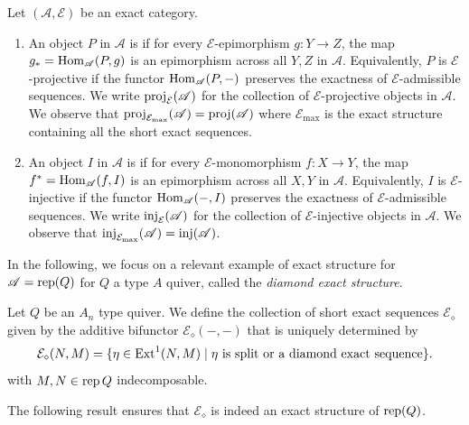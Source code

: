 \begin{definition}
\end{definition}

\begin{definition}\label{def:Eprojectivesinjectives}
Let $(\mathscr{A}, \mathcal{E})$ be an exact category.
\begin{enumerate}[label=$\bullet$,itemsep=1mm]
    \item An object $P$ in $\mathscr{A}$ is  if for every $\mathcal{E}$-epimorphism $g: Y \to Z$, the map $g_* = \operatorname{Hom}_\mathscr{A}(P,g)$ is an epimorphism across all $Y, Z$ in $\mathscr{A}$. Equivalently, $P$ is $\mathcal{E}$-projective if the functor $\operatorname{Hom}_\mathscr{A}(P,-)$ preserves the exactness of $\mathcal{E}$-admissible sequences. We write $\operatorname{proj}_\mathcal{E}(\mathscr{A})$ for the collection of $\mathcal{E}$-projective objects in $\mathscr{A}$. We observe that $\operatorname{proj}_{\mathcal{E}_{\max}}(\mathscr{A}) = \operatorname{proj}(\mathscr{A})$ where $\mathcal{E}_{\max}$ is the exact structure containing all the short exact sequences. 
    \item An object $I$ in $\mathscr{A}$ is  if for every $\mathcal{E}$-monomorphism $f: X \to Y$, the map $f^* = \operatorname{Hom}_\mathscr{A}(f,I)$ is an epimorphism across all $X, Y$ in $\mathscr{A}$. Equivalently, $I$ is $\mathcal{E}$-injective if the functor $\operatorname{Hom}_\mathscr{A}(-,I)$ preserves the exactness of $\mathcal{E}$-admissible sequences. We write $\operatorname{inj}_{\mathcal{E}}(\mathscr{A})$ for the collection of $\mathcal{E}$-injective objects in $\mathscr{A}$. We observe that $\operatorname{inj}_{\mathcal{E}_{\max}}(\mathscr{A}) = \operatorname{inj}(\mathscr{A})$.
\end{enumerate}
\end{definition}

In the following, we focus on a relevant example of exact structure for $\mathscr{A} = \operatorname{rep}(Q)$ for $Q$ a type $A$ quiver, called the \emph{diamond exact structure}.

\begin{definition} \label{def:Ediamond}
Let $Q$ be an $A_n$ type quiver. We define the collection of short exact sequences $\mathcal{E}_{\diamond}$ given by the additive bifunctor $\mathcal{E_\diamond}(-,-)$ that is uniquely determined by
\[
\mathcal{E}_\diamond(N,M) = \{ \eta \in \operatorname{Ext}^1(N,M) \; | \; \eta \mbox{ is split or a diamond exact sequence}\}.\] with $M,N \in \operatorname{rep} Q$ indecomposable.
\end{definition}

\bigskip

The following result ensures that $\mathcal{E}_\diamond$ is indeed an exact structure of $\operatorname{rep}(Q)$.

